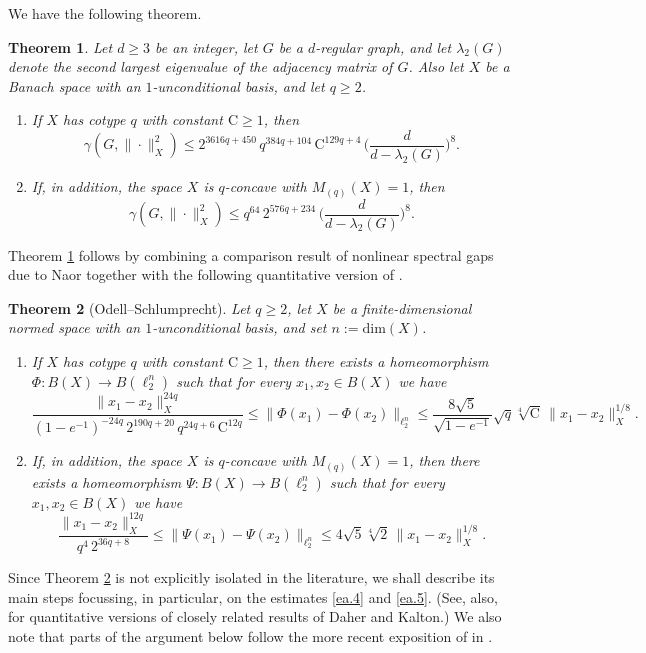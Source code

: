 \documentclass[11pt,leqno]{amsart}
\newtheorem{theorem}{Theorem}[section]
\theoremstyle{remark}
\theoremstyle{plain}
\begin{document}
We have the following theorem.
\begin{theorem} \label{OS-spectral-gap}
Let $d\geqslant 3$ be an integer, let $G$ be a $d$-regular graph, and let $\lambda_2(G)$ denote the second largest
eigenvalue of the adjacency matrix of $G$.
Also let $X$ be a Banach space with an $1$-unconditional basis, and let $q\geqslant 2$.
\begin{enumerate}
\item[(i)] If $X$ has cotype $q$ with constant $\mathrm{C}\geqslant 1$, then
\[ \gamma(G,\|\cdot\|_X^2) \leqslant 2^{3616q+450}\, q^{384q+104}\, \mathrm{C}^{129q+4}\, \Big( \frac{d}{d-\lambda_2(G)}\Big)^8. \]
\item[(ii)] If, in addition, the space $X$ is $q$-concave with $M_{(q)}(X)=1$, then
\[ \gamma(G,\|\cdot\|_X^2) \leqslant q^{64}\, 2^{576q+234}\, \Big( \frac{d}{d-\lambda_2(G)}\Big)^8. \]
\end{enumerate}
\end{theorem}
Theorem \ref{OS-spectral-gap} follows by combining a comparison result of nonlinear spectral gaps
due to Naor \cite[Theorem 1.10]{Na14} together with the following quantitative version of \cite[Theorem 2.1]{OS94}.
\begin{theorem}[Odell--Schlumprecht] \label{OS-uniform-homeomorphism}
Let $q\geqslant 2$, let $X$ be a finite-dimensional normed space with an $1$-unconditional basis,
and set $n:=\mathrm{dim}(X)$.
\begin{enumerate}
\item[(i)] If $X$ has cotype $q$ with constant $\mathrm{C}\!\geqslant\!1$, then there exists a homeomorphism
$\Phi\colon B(X)\to B(\ell_2^n)$ such that for every $x_1,x_2\in B(X)$ we have
\begin{equation} \label{ea.4}
\!\!\!\frac{\|x_1-x_2\|_X^{24q}}{(1-e^{-1})^{-24q}\, 2^{190q+20}\, q^{24q+6}\, \mathrm{C}^{12q}} \leqslant
\|\Phi(x_1) -\Phi(x_2)\|_{\ell_2^n} \leqslant \frac{8\sqrt{5}}{\sqrt{1-e^{-1}}} \sqrt{q} \sqrt[4]{\mathrm{C}}\, \|x_1-x_2\|_X^{1/8}.
\end{equation}
\item[(ii)] If, in addition, the space $X$ is $q$-concave with $M_{(q)}(X)=1$, then there exists a homeomorphism
$\Psi\colon B(X)\to B(\ell_2^n)$ such that for every $x_1,x_2\in B(X)$ we have
\begin{equation} \label{ea.5}
\frac{\|x_1-x_2\|_X^{12q}}{q^4\, 2^{36q+8}} \leqslant \|\Psi(x_1) -\Psi(x_2)\|_{\ell_2^n} \leqslant
4\sqrt{5}\sqrt[4]{2}\, \|x_1-x_2\|_X^{1/8}.
\end{equation}
\end{enumerate}
\end{theorem}
Since Theorem \ref{OS-uniform-homeomorphism} is not explicitly isolated in the literature, we shall describe its main
steps focussing, in particular, on the estimates \eqref{ea.4} and \eqref{ea.5}.
(See, also, \cite{ANNRW18b} for quantitative versions of closely related results of Daher \cite{Da95} and Kalton.)
We also note that parts of the argument below follow the
more recent exposition of \cite[Theorem 2.1]{OS94} in \cite[Chapter 9]{BL00}.
\end{document}

